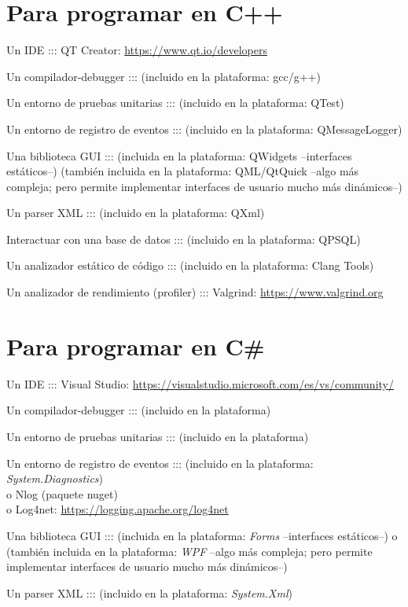 \documentclass[spanish,12pt,a4paper,final,oneside]{book}
\begin{document}
\section{Para programar en C++}

Un IDE ::: QT Creator: \url{https://www.qt.io/developers}  

Un compilador-debugger ::: (incluido en la plataforma: gcc/g++)

Un entorno de pruebas unitarias ::: (incluido en la plataforma: QTest)

Un entorno de registro de eventos ::: (incluido en la plataforma: QMessageLogger)

Una biblioteca GUI ::: (incluida en la plataforma: QWidgets --interfaces estáticos--) (también incluida en la plataforma: QML/QtQuick --algo más compleja; pero permite implementar interfaces de usuario mucho más dinámicos--)

Un parser XML ::: (incluido en la plataforma: QXml)

Interactuar con una base de datos ::: (incluido en la plataforma: QPSQL) 

Un analizador estático de código ::: (incluido en la plataforma: Clang Tools)

Un analizador de rendimiento (profiler) ::: Valgrind: \url{https://www.valgrind.org} 

\section{Para programar en C\#}

Un IDE ::: Visual Studio: \url{https://visualstudio.microsoft.com/es/vs/community/} 

Un compilador-debugger ::: (incluido en la plataforma)

Un entorno de pruebas unitarias :::  (incluido en la plataforma)

Un entorno de registro de eventos ::: (incluido en la plataforma: \textit{System.Diagnostics})
\\o Nlog (paquete nuget)
\\o Log4net: \url{https://logging.apache.org/log4net}

Una biblioteca GUI ::: (incluida en la plataforma: \textit{Forms} --interfaces estáticos--) o (también incluida en la plataforma: \textit{WPF} --algo más compleja; pero permite implementar interfaces de usuario mucho más dinámicos--) 

Un parser XML ::: (incluido en la plataforma: \textit{System.Xml})
\end{document}

